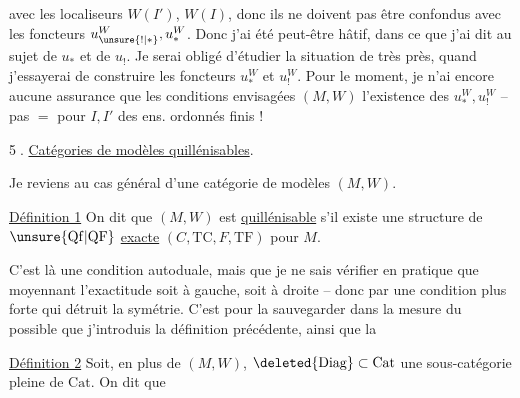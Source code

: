 
avec les localiseurs $W(I')$, $W(I)$, donc ils ne  doivent pas être confondus avec les foncteurs $u_{\unsure{!|*}}^W,u_*^W$.  Donc j'ai été peut-être hâtif, dans ce que j'ai dit au sujet de $u_*$ et de $u_!$. Je serai obligé d'étudier la situation de très près, quand j'essayerai de construire les foncteurs $u_*^W$ et $u_!^W$. Pour le moment, je n'ai encore aucune assurance que les conditions envisagées  $(M,W)$   l'existence des $u_*^W,u_!^W$ -- pas $=$ pour $I,I'$ des ens. ordonnés finis !






\margin{[\uline{Cor.} ? Soit $\unsure{I'|II'}\overset{u}{\leftrightarrow}I$ \uline{imm. ouverte}. Alors \unsure{pour} $X\in\mathrm{ob}\,M(I)_f$, $\varprojlim_I X(i)\to\varprojlim_{I'}\unsure{\alpha|X}(i')$ est dans $F$.}

\textcircled{5}. \uline{Catégories de modèles quillénisables}.

Je reviens au cas général d'une catégorie de modèles $(M,W)$.

\llap{\raisebox{-1.75\baselineskip}[0pt][0pt]{\rule{0.4pt}{1.85\baselineskip}}\hspace{0.5em}}\uline{Définition 1} On dit que $(M,W)$ est \uline{quillénisable} s'il existe une structure de $\unsure{\mathrm{Qf}|\mathrm{QF}}$ \uline{exacte} $(C,\mathrm{TC},F,\mathrm{TF})$ pour $M$.

C'est là une condition autoduale, mais que je ne sais vérifier en pratique que moyennant l'exactitude soit à gauche, soit à droite -- donc par une condition plus forte qui détruit la symétrie. C'est pour la sauvegarder dans la mesure du possible que j'introduis la définition précédente, ainsi que la

\uline{Définition 2} Soit, en plus de $(M,W)$, $\deleted{\mathrm{Diag}}\subset\mathrm{Cat}$ une sous-catégorie pleine de $\mathrm{Cat}$. On dit que
